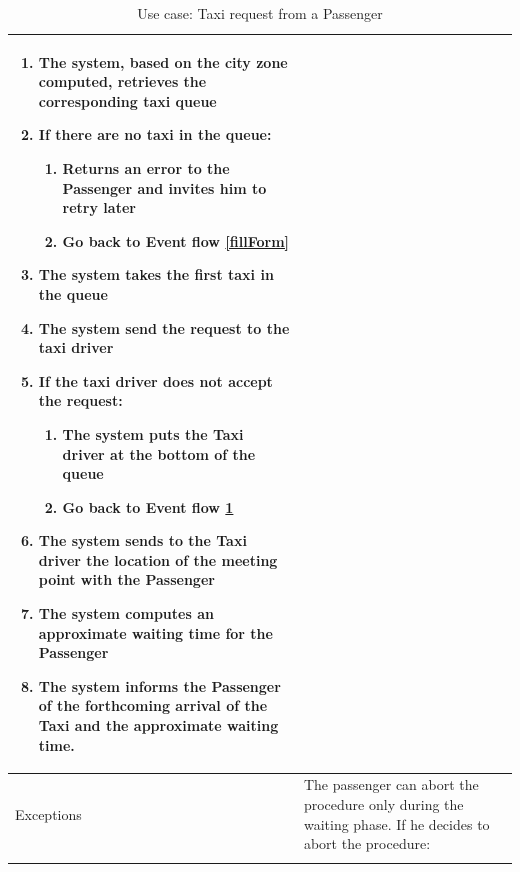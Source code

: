 \begin{center}
\begin{longtable}{| p{} | p{} |}
\begin{enumerate}
				\item The system, based on the city zone computed, retrieves the corresponding taxi queue
				\item If there are no taxi in the queue: \label{noTaxi}
				\begin{enumerate}
					\item Returns an error to the Passenger and invites him to retry later
					\item Go back to Event flow \ref{fillForm}
				\end{enumerate}
				\item The system takes the first taxi in the queue
				\item The system send the request to the taxi driver
				\item If the taxi driver does not accept the request:
				\begin{enumerate}
					\item The system puts the Taxi driver at the bottom of the queue
					\item Go back to Event flow \ref{noTaxi}
				\end{enumerate}
				\item The system sends to the Taxi driver the location of the meeting point with the Passenger
				\item The system computes an approximate waiting time for the Passenger
				\item The system informs the Passenger of the forthcoming arrival of the Taxi and the approximate waiting time.
			\end{enumerate} \\ \hline
Exceptions & The passenger can abort the procedure only during the	waiting phase. If he decides to abort the procedure:
\\ \hline
\caption{Use case: Taxi request from a Passenger}
\end{longtable}

\end{center}
